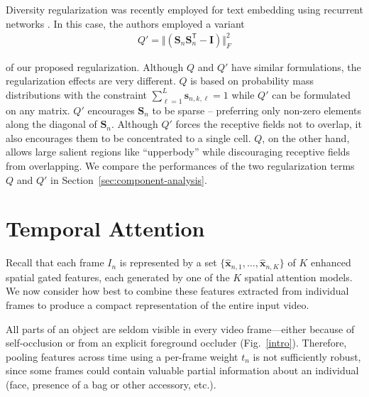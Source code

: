 Diversity regularization was recently employed for text embedding using recurrent networks \cite{lin2017structured}.  In this case, the authors employed a variant 
%
\begin{align}
Q' = \Vert ( \mathbf{S}_n \mathbf{S}_n^\mathsf{T}-\mathbf{I}) \Vert_F^2
\end{align}

\noindent of our proposed regularization. Although $Q$ and $Q'$ have similar formulations, the regularization effects are very different. $Q$ is based on probability mass distributions with the constraint $\sum_{\ell=1}^L \mathbf{s}_{n,k,\ell}=1$ while $Q'$ can be formulated on any matrix. $Q'$ encourages $\mathbf{S}_n$ to be sparse -- preferring only non-zero elements along the diagonal of $\mathbf{S}_n$.  
Although $Q'$ forces the receptive fields not to overlap, it also encourages them to be concentrated to a single cell.  $Q$, on the other hand, allows large salient regions like ``upperbody'' while discouraging receptive fields from overlapping. We compare the performances of the two regularization terms $Q$ and $Q'$ in Section~\ref{sec:component-analysis}. 

\section{Temporal Attention}
\label{sec:temporal}

Recall that each frame $I_n$ is represented by a set $\{ \widehat{\mathbf{x}}_{n,1}, \ldots, \widehat{\mathbf{x}}_{n,K} \}$ of $K$ enhanced spatial gated features, each generated by one of the $K$ spatial attention models.  We now consider how best to combine these features extracted from individual frames to produce a compact representation of the entire input video. 

All parts of an object are seldom visible in every video frame---either because of self-occlusion or from an explicit foreground occluder (Fig.~\ref{intro}).  Therefore, pooling features across time using a per-frame weight $t_n$ is not sufficiently robust, since some frames could contain valuable partial information about an individual (\eg face, presence of a bag or other accessory, etc.). 

